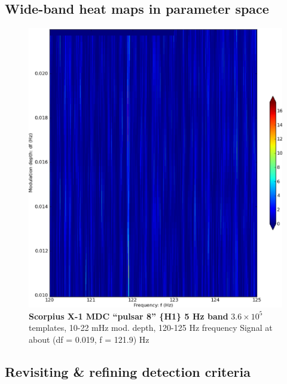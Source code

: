\subsection{Wide-band heat maps in parameter space}


\begin{figure}
\begin{center}
\includegraphics[width=0.8\paperwidth,height=0.62\paperheight]{bandH1.eps}
\caption{\textbf{Scorpius X-1 MDC ``pulsar 8'' \{H1\} 5 Hz band}
\newline $3.6\times10^{5}$ templates, 10-22 mHz mod. depth, 120-125 Hz frequency
\newline Signal at about (df = 0.019, f = 121.9) Hz
}
\end{center}
\end{figure}



\subsection{Revisiting \& refining detection criteria}



